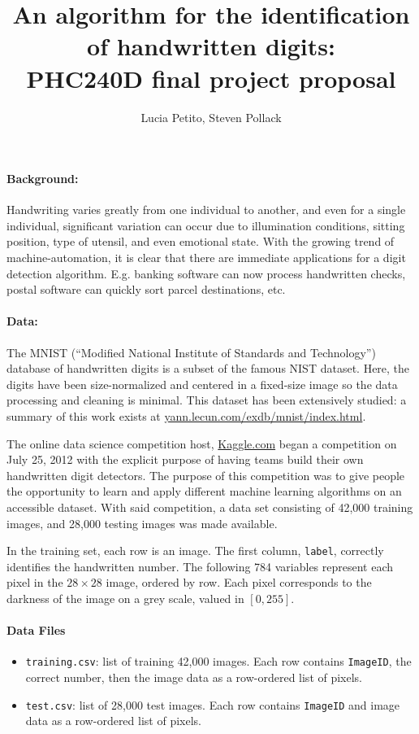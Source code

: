 \documentclass[10pt]{article}
\title{An algorithm for the identification of handwritten digits: \\ PHC240D final project proposal}
\author{Lucia Petito, Steven Pollack}
\date{}
\begin{document}
\maketitle

\paragraph{Background:}
Handwriting varies greatly from one individual to another, and even for a single individual, significant variation can occur due to illumination conditions, sitting position, type of utensil, and even emotional state. With the growing trend of machine-automation, it is clear that there are immediate applications for a digit detection algorithm. E.g. banking software can now process handwritten checks, postal software can quickly sort parcel destinations, etc.


\paragraph{Data:} The MNIST (``Modified National Institute of Standards and Technology'') database of handwritten digits is a subset of the famous NIST dataset.  Here, the digits have been size-normalized and centered in a fixed-size image so the data processing and cleaning is minimal.  This dataset has been extensively studied: a summary of this work exists at \url{yann.lecun.com/exdb/mnist/index.html}.

The online data science competition host, \url{Kaggle.com} began a competition on July 25, 2012 with the explicit purpose of having teams build their own handwritten digit detectors. The purpose of this competition was to give people the opportunity to learn and apply different machine learning algorithms on an accessible dataset.  With said competition, a data set consisting of 42,000 training images, and 28,000 testing images was made available. 

In the training set, each row is an image.  The first column, \verb|label|, correctly identifies the handwritten number.  The following 784 variables represent each pixel in the $28 \times 28$ image, ordered by row.  Each pixel corresponds to the darkness of the image on a grey scale, valued in $[0, 255]$.  
\paragraph{Data Files}
\begin{itemize}
  \item \texttt{training.csv}: list of training 42,000 images. Each row contains \verb|ImageID|, the correct number, then the image data as a row-ordered list of pixels.
  \item \texttt{test.csv}: list of 28,000 test images. Each row contains \verb|ImageID| and image data as a row-ordered list of pixels.
\end{itemize}
\end{document}
